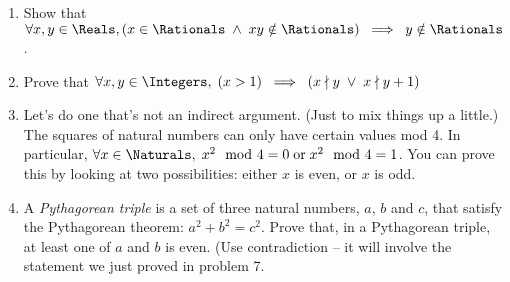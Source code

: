 \documentclass{amsart}
\begin{document}
\begin{enumerate}
\item Show that $\displaystyle \forall x, y \in \Reals, (x \in \Rationals \; \land \; xy \notin \Rationals) \; \implies \; y \notin \Rationals$.

\vfill

\item Prove that $\displaystyle \forall x, y \in \Integers, \; (x >1 ) \; \implies \; ( x \nmid y \; \lor \; x \nmid y+1 )$

\vfill

\newpage

\item Let's do one that's not an indirect argument.  (Just to mix things up a little.) The squares of natural numbers can only have certain values mod 4. In particular, $\forall x \in \Naturals, \; x^2 \mod{4} = 0 \; \mbox{or} \; x^2 \mod{4} = 1$.  You can prove this by looking at two possibilities: either $x$ is even, or $x$ is odd.

\vfill

\item A \emph{Pythagorean triple} is a set of three
natural numbers, $a$, $b$ and $c$, that satisfy the Pythagorean theorem: $a^2 + b^2 = c^2$.   Prove that, in a
Pythagorean triple, at least one of $a$ and $b$ is even. (Use contradiction -- it will involve the statement we just proved in problem 7.

\vfill

\end{enumerate}
\end{document}
